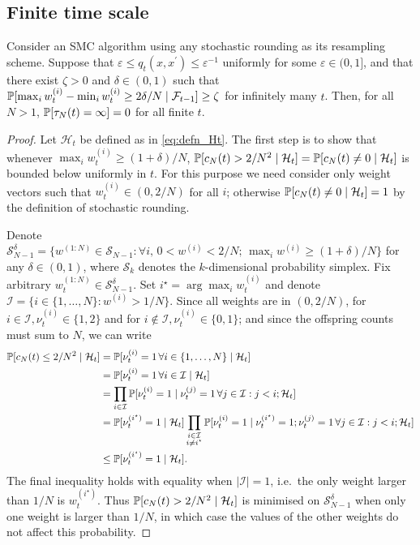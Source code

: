 \subsection{Finite time scale}

\begin{lemma}\label{thm:SR_nontriviality}
Consider an SMC algorithm using any stochastic rounding as its resampling scheme.
Suppose that $\varepsilon \leq q_t(x, x^\prime) \leq \varepsilon^{-1}$ uniformly for some $\varepsilon \in (0,1]$, and that there exist $\zeta >0$ and $\delta \in (0,1)$ such that $\mathbb{P}[ \max_i w_t^{(i)} - \min_i w_t^{(i)} \geq 2\delta/N \mid \mathcal{F}_{t-1} ] \geq \zeta$ for infinitely many $t$. Then, for all $N>1$, $\mathbb{P}[ \tau_N(t) = \infty ] =0$ for all finite $t$.
\end{lemma}

\begin{proof}
Let $\mathcal{H}_t$ be defined as in \eqref{eq:defn_Ht}. The first step is to show that whenever $\max_i w_t^{(i)} \geq (1+\delta)/N$, $\mathbb{P}[  c_N(t) > 2/N^2 \mid \mathcal{H}_t ] = \mathbb{P}[ c_N(t) \neq 0 \mid \mathcal{H}_t ]$ is bounded below uniformly in $t$.
For this purpose we need consider only weight vectors such that $w_t^{(i)} \in (0,2/N)$ for all $i$; otherwise $\mathbb{P}[ c_N(t) \neq 0 \mid \mathcal{H}_t ] =1$ by the definition of stochastic rounding.

Denote $\mathcal{S}_{N-1}^\delta = \{ w^{(1:N)} \in \mathcal{S}_{N-1} :  \forall i, \, 0 <w^{(i)} <2/N ;\, \max_i w^{(i)} \geq (1 + \delta)/N \}$ for any $\delta \in (0, 1)$, where $\mathcal{S}_{k}$ denotes the $k$-dimensional probability simplex.
Fix arbitrary $w_t^{(1:N)} \in \mathcal{S}_{N-1}^\delta$. Set $i^\star = \arg\max_i w_t^{(i)}$ and denote $\mathcal{I} = \{i \in \{1,\dots,N\} : w^{(i)} > 1/N \}$.
Since all weights are in $(0, 2/N)$, for $i \in \mathcal{I}, \nu_t^{(i)} \in \{1,2\}$ and for $i \notin \mathcal{I}, \nu_t^{(i)} \in \{0,1\}$; and since the offspring counts must sum to $N$, we can write
\begin{align}\label{eq:smallcN_istar}
\mathbb{P}[ c_N(t) \leq 2/N^2 \mid \mathcal{H}_t ]
&= \mathbb{P}[ \nu_t^{(i)} =1 \,\forall i\in\{1,\dots,N\} \mid \mathcal{H}_t ] \notag\\
&= \mathbb{P}[ \nu_t^{(i)} =1 \,\forall i\in \mathcal{I} \mid \mathcal{H}_t ] \notag\\
&= \prod_{i \in \mathcal{I}} \mathbb{P}[ \nu_t^{(i)} =1 \mid \nu_t^{(j)}=1 \,\forall j \in \mathcal{I}: j<i; \mathcal{H}_t ] \notag\\
&= \mathbb{P}[ \nu_t^{(i^\star)} =1 \mid \mathcal{H}_t ] \prod_{\substack{i \in \mathcal{I} \\ i \neq i^\star}} \mathbb{P}[ \nu_t^{(i)} =1 \mid \nu_t^{(i^\star)}=1; \nu_t^{(j)}=1 \,\forall j \in \mathcal{I}: j<i ; \mathcal{H}_t ] \notag\\
&\leq \mathbb{P}[ \nu_t^{(i^\star)} =1 \mid \mathcal{H}_t ] .
\end{align}
The final inequality holds with equality when $|\mathcal{I}| =1$, i.e.\ the only weight larger than $1/N$ is $w_t^{(i^\star)}$.
Thus $\mathbb{P}[ c_N(t) > 2/N^2 \mid \mathcal{H}_t ]$ is minimised on $\mathcal{S}_{N-1}^\delta$ when only one weight is larger than $1/N$, in which case the values of the other weights do not affect this probability. 


\end{proof}
